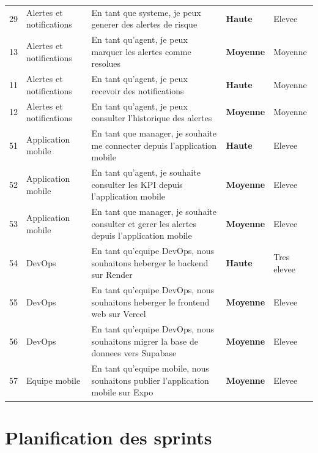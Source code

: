 \documentclass[a4paper,12pt]{report}
\begin{document}
\begin{longtable}{|C{0.8cm}|L{2.8cm}|L{6.1cm}|C{2cm}|C{2.8cm}|}
29 & Alertes et notifications & En tant que systeme, je peux generer des alertes de risque                                         & \textcolor{haute}{\textbf{Haute}}     & Elevee     \\
13 & Alertes et notifications & En tant qu'agent, je peux marquer les alertes comme resolues                                       & \textcolor{moyenne}{\textbf{Moyenne}} & Moyenne    \\
11 & Alertes et notifications & En tant qu'agent, je peux recevoir des notifications                                                & \textcolor{haute}{\textbf{Haute}}     & Moyenne    \\
12 & Alertes et notifications & En tant qu'agent, je peux consulter l'historique des alertes                                       & \textcolor{moyenne}{\textbf{Moyenne}} & Moyenne    \\
51 & Application mobile     & En tant que manager, je souhaite me connecter depuis l'application mobile                            & \textcolor{haute}{\textbf{Haute}}     & Elevee     \\
52 & Application mobile     & En tant qu'agent, je souhaite consulter les KPI depuis l'application mobile                          & \textcolor{moyenne}{\textbf{Moyenne}} & Elevee     \\
53 & Application mobile     & En tant que manager, je souhaite consulter et gerer les alertes depuis l'application mobile          & \textcolor{moyenne}{\textbf{Moyenne}} & Elevee     \\
54 & DevOps                 & En tant qu'equipe DevOps, nous souhaitons heberger le backend sur Render                             & \textcolor{haute}{\textbf{Haute}}     & Tres elevee\\
55 & DevOps                 & En tant qu'equipe DevOps, nous souhaitons heberger le frontend web sur Vercel                        & \textcolor{moyenne}{\textbf{Moyenne}} & Elevee     \\
56 & DevOps                 & En tant qu'equipe DevOps, nous souhaitons migrer la base de donnees vers Supabase                    & \textcolor{moyenne}{\textbf{Moyenne}} & Elevee     \\
57 & Equipe mobile          & En tant qu'equipe mobile, nous souhaitons publier l'application mobile sur Expo                       & \textcolor{moyenne}{\textbf{Moyenne}} & Elevee     
\end{longtable}

\section{Planification des sprints}
\end{document}
